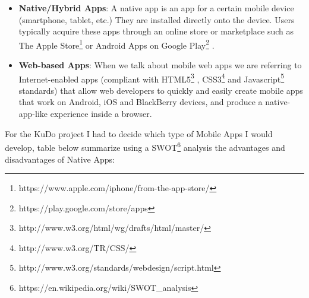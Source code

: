 \documentclass[a4paper,12pt]{book}
\begin{document}
\begin{itemize}
 \item \textbf{Native/Hybrid Apps}: A native app is an app for a certain mobile device (smartphone, tablet, etc.) They are installed directly onto the device. Users typically acquire these apps through an online store or marketplace such as The Apple Store\footnote{https://www.apple.com/iphone/from-the-app-store/} or Android Apps on Google Play\footnote{https://play.google.com/store/apps} .
 \item \textbf{Web-based Apps}: When we talk about mobile web apps we are referring to Internet-enabled apps (compliant with HTML5\footnote{http://www.w3.org/html/wg/drafts/html/master/} , CSS3\footnote{http://www.w3.org/TR/CSS/} and Javascript\footnote{http://www.w3.org/standards/webdesign/script.html}  standards) that allow web developers to quickly and easily create mobile apps that work on Android, iOS and BlackBerry devices, and produce a native-app-like experience inside a browser. 
\end{itemize}

For the KuDo project I had to decide which type of Mobile Apps I would develop, table below summarize using a SWOT\footnote{https://en.wikipedia.org/wiki/SWOT\_analysis} analysis the advantages and disadvantages of Native Apps:
\end{document}
